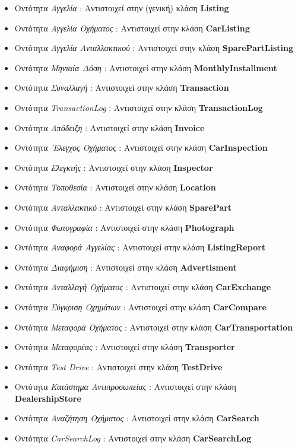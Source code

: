 \documentclass{../ol-softwaremanual}
\begin{document}
	\begin{itemize}
		\item Οντότητα \textit{Αγγελία} : Αντιστοιχεί στην (γενική) κλάση \en \textbf{Listing}\gr
		\item Οντότητα \textit{Αγγελία Οχήματος} : Αντιστοιχεί στην κλάση \en \textbf{CarListing}\gr
		\item Οντότητα \textit{Αγγελία Ανταλλακτικού} : Αντιστοιχεί στην κλάση \en \textbf{SparePartListing}\gr
		\item Οντότητα \textit{Μηνιαία Δόση} : Αντιστοιχεί στην κλάση \en\textbf{MonthlyInstallment}\gr
		\item Οντότητα \textit{Συναλλαγή} : Αντιστοιχεί στην κλάση \en \textbf{Transaction}\gr
		\item Οντότητα \en \textit{TransactionLog} \gr : Αντιστοιχεί στην κλάση \en \textbf{TransactionLog}\gr
		\item Οντότητα \textit{Απόδειξη} : Αντιστοιχεί στην κλάση \en \textbf{Invoice}\gr
		\item Οντότητα \textit{'Ελεγχος Οχήματος} : Αντιστοιχεί στην κλάση \en \textbf{CarInspection}\gr
		\item Οντότητα \textit{Ελεγκτής} : Αντιστοιχεί στην κλάση \en \textbf{Inspector}\gr
		\item Οντότητα \textit{Τοποθεσία} : Αντιστοιχεί στην κλάση \en \textbf{Location}\gr
		\item Οντότητα \textit{Ανταλλακτικό} : Αντιστοιχεί στην κλάση \en \textbf{SparePart}\gr
		\item Οντότητα \textit{Φωτογραφία} : Αντιστοιχεί στην κλάση \en \textbf{Photograph}\gr
		\item Οντότητα \textit{Αναφορά Αγγελίας} : Αντιστοιχεί στην κλάση \en \textbf{ListingReport}\gr
		\item Οντότητα \textit{Διαφήμιση} : Αντιστοιχεί στην κλάση \en \textbf{Advertisment}\gr
		\item Οντότητα \textit{Ανταλλαγή Οχήματος} : Αντιστοιχεί στην κλάση \en \textbf{CarExchange}\gr
		\item Οντότητα \textit{Σύγκριση Οχημάτων} : Αντιστοιχεί στην κλάση \en \textbf{CarCompare}\gr
		\item Οντότητα \textit{Μεταφορά Οχήματος} : Αντιστοιχεί στην κλάση \en \textbf{CarTransportation}\gr
		\item Οντότητα \textit{Μεταφορέας} : Αντιστοιχεί στην κλάση \en \textbf{Transporter}\gr
		\item Οντότητα \en \textit{Test Drive} \gr : Αντιστοιχεί στην κλάση \en \textbf{TestDrive}\gr
		\item Οντότητα \textit{Κατάστημα Αντιπροσωπείας} : Αντιστοιχεί στην κλάση \en \textbf{DealershipStore}\gr
		\item Οντότητα \textit{Αναζήτηση Οχήματος} : Αντιστοιχεί στην κλάση \en \textbf{CarSearch} \gr
		\item Οντότητα \en \textit{CarSearchLog} \gr : Αντιστοιχεί στην κλάση \en \textbf{CarSearchLog} \gr		
	\end{itemize}
	
\end{document}
